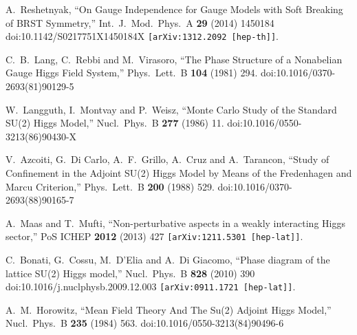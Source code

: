 \documentclass[a4paper,11pt,british,twosides]{book}%
\numberwithin{equation}{section}
\begin{document}
\begin{thebibliography}{9}
  A.~Reshetnyak,
  ``On Gauge Independence for Gauge Models with Soft Breaking of BRST Symmetry,''
  Int.\ J.\ Mod.\ Phys.\ A {\bf 29} (2014) 1450184
  doi:10.1142/S0217751X1450184X
  {\tt [arXiv:1312.2092 [hep-th]]}.

  C.~B.~Lang, C.~Rebbi and M.~Virasoro,
  ``The Phase Structure of a Nonabelian Gauge Higgs Field System,''
  Phys.\ Lett.\ B {\bf 104} (1981) 294.
  doi:10.1016/0370-2693(81)90129-5

  W.~Langguth, I.~Montvay and P.~Weisz,
  ``Monte Carlo Study of the Standard SU(2) Higgs Model,''
  Nucl.\ Phys.\ B {\bf 277} (1986) 11.
  doi:10.1016/0550-3213(86)90430-X

  V.~Azcoiti, G.~Di Carlo, A.~F.~Grillo, A.~Cruz and A.~Tarancon,
  ``Study of Confinement in the Adjoint SU(2) Higgs Model by Means of the Fredenhagen and Marcu
  Criterion,''
  Phys.\ Lett.\ B {\bf 200} (1988) 529.
  doi:10.1016/0370-2693(88)90165-7

  A.~Maas and T.~Mufti,
  ``Non-perturbative aspects in a weakly interacting Higgs sector,''
  PoS ICHEP {\bf 2012} (2013) 427
  {\tt [arXiv:1211.5301 [hep-lat]]}.

  C.~Bonati, G.~Cossu, M.~D'Elia and A.~Di Giacomo,
  ``Phase diagram of the lattice SU(2) Higgs model,''
  Nucl.\ Phys.\ B {\bf 828} (2010) 390
  doi:10.1016/j.nuclphysb.2009.12.003
  {\tt [arXiv:0911.1721 [hep-lat]]}.

  A.~M.~Horowitz,
  ``Mean Field Theory And The Su(2) Adjoint Higgs Model,''
  Nucl.\ Phys.\ B {\bf 235} (1984) 563.
  doi:10.1016/0550-3213(84)90496-6


\end{thebibliography}
\end{document}

